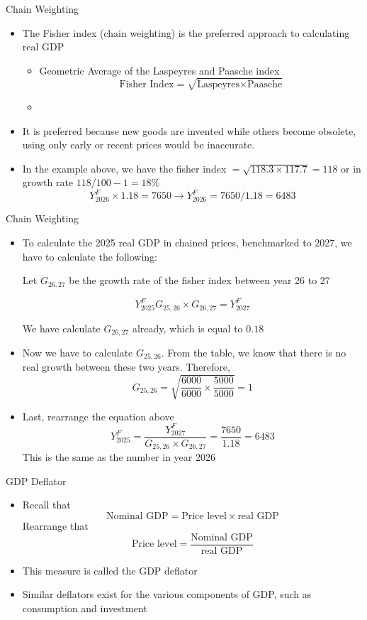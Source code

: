 \documentclass[aspectratio=1610]{beamer}
\begin{document}
\begin{frame}[wide]{Chain Weighting}
	\begin{itemize}
		\item The Fisher index (chain weighting) is the preferred approach to calculating real GDP
		\begin{itemize}
			\item Geometric Average of the Laspeyres and Paasche index
				\[\mbox{Fisher Index} = \sqrt{\mbox{Laspeyres} \times \mbox{Paasche}}\]
			\item 
		\end{itemize}
		\item It is preferred because new goods are invented while others become obsolete, using only early or recent prices would be inaccurate.
		\item In the example above, we have the fisher index $=\sqrt{118.3\times 117.7} = 118$ or in growth rate $118/100 -1 = 18\%$
		\[Y^F_{2026} \times 1.18= 7650 \to Y^F_{2026} = 7650/1.18 = 6483\]
	\end{itemize}
\end{frame}

\begin{frame}[wide]{Chain Weighting}
	\begin{itemize}
		\item To calculate the 2025 real GDP in chained prices, benchmarked to 2027, we have to calculate the following:
		
		Let $G_{26,27}$ be the growth rate of the fisher index between year 26 to 27
		
		\[Y^F_{2025} G_{25,26}\times G_{26,27} = Y^F_{2027}\]
		
		We have calculate $G_{26,27}$ already, which is equal to $0.18$
		
		\item Now we have to calculate $G_{25,26}$. From the table, we know that there is no real growth between these two years. Therefore, 
		\[G_{25,26} = \sqrt{\frac{6000}{6000} \times \frac{5000}{5000}} = 1\]
		
		\item Last, rearrange the equation above
		\[Y^F_{2025}  = \frac{Y^F_{2027}}{G_{25,26}\times G_{26,27}} = \frac{7650}{1.18} = 6483\]
		This is the same as the number in year 2026
	\end{itemize}
\end{frame}

\begin{frame}[wide]{GDP Deflator}
	\begin{itemize}
		\item Recall that 
		\[\mbox{Nominal GDP} = \mbox{Price level} \times \mbox{real GDP}\]
		Rearrange that
		\[\mbox{Price level} = \frac{\mbox{Nominal GDP}}{\mbox{real GDP}} \]
		\item This measure is called the GDP deflator
		\item Similar deflators exist for the various components of GDP, such as consumption and investment
	\end{itemize}
\end{frame}
\end{document}
